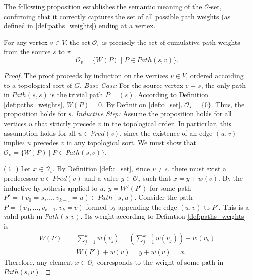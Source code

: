 The following proposition establishes the semantic meaning of the $\mathcal{O}$-set, confirming that it correctly captures the set of all possible path weights (as defined in \ref{def:paths_weights}) ending at a vertex.

\begin{proposition}
    \label{prop:o_set_correctness}
    For any vertex $v \in V$, the set $\mathcal{O}_v$ is precisely the set of cumulative path weights from the source $s$ to $v$:
    \[ \mathcal{O}_v = \{ W(P) \mid P \in Path(s, v) \}. \]
\end{proposition}
\begin{proof}
    The proof proceeds by induction on the vertices $v \in V$, ordered according to a topological sort of $G$.
    \textit{Base Case:} For the source vertex $v=s$, the only path in $Path(s, s)$ is the trivial path $P=(s)$. According to Definition \ref{def:paths_weights}, $W(P)=0$. By Definition \ref{def:o_set}, $\mathcal{O}_s = \{0\}$. Thus, the proposition holds for $s$.
    \textit{Inductive Step:} Assume the proposition holds for all vertices $u$ that strictly precede $v$ in the topological order. In particular, this assumption holds for all $u \in Pred(v)$, since the existence of an edge $(u, v)$ implies $u$ precedes $v$ in any topological sort. We must show that $\mathcal{O}_v = \{ W(P) \mid P \in Path(s, v) \}$.

    ($\subseteq$) Let $x \in \mathcal{O}_v$. By Definition \ref{def:o_set}, since $v \neq s$, there must exist a predecessor $u \in Pred(v)$ and a value $y \in \mathcal{O}_u$ such that $x = y + w(v)$. By the inductive hypothesis applied to $u$, $y = W'(P')$ for some path $P' = (v_0=s, \dots, v_{k-1}=u) \in Path(s, u)$. Consider the path $P = (v_0, \dots, v_{k-1}, v_k=v)$ formed by appending the edge $(u, v)$ to $P'$. This is a valid path in $Path(s, v)$. Its weight according to Definition \ref{def:paths_weights} is
    \begin{align*}
        W(P) & = \sum_{j=1}^{k} w(v_j) = \left(\sum_{j=1}^{k-1} w(v_j)\right) + w(v_k) \\
             & = W(P') + w(v) = y + w(v) = x.
    \end{align*}
    Therefore, any element $x \in \mathcal{O}_v$ corresponds to the weight of some path in $Path(s, v)$.


\end{proof}
